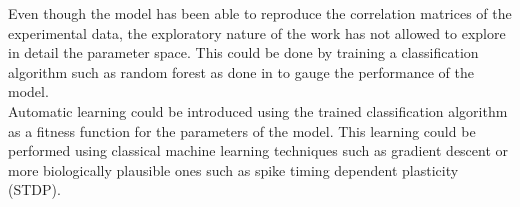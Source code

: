 Even though the model has been able to reproduce the correlation matrices of the experimental data, the exploratory nature of the work has not allowed to explore in detail the parameter space.
This could be done by training a classification algorithm such as random forest as done in \cite{sleep-correlates} to gauge the performance of the model.\\

Automatic learning could be introduced using the trained classification algorithm as a fitness function for the parameters of the model.
This learning could be performed using classical machine learning techniques such as gradient descent or more biologically plausible ones \cite{snn-training} such as spike timing dependent plasticity (STDP).
